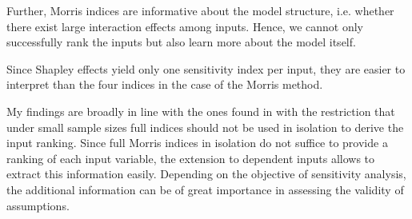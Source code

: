 Further, Morris indices are informative about the model structure, i.e. whether there exist large interaction effects among inputs. Hence, we cannot only successfully rank the inputs but also learn more about the model itself.

Since Shapley effects yield only one sensitivity index per input, they are easier to interpret than the four indices in the case of the Morris method.

My findings are broadly in line with the ones found in \citet{GM17} with the restriction that under small sample sizes full indices should not be used in isolation to derive the input ranking. %
Since full Morris indices in isolation do not suffice to provide a ranking of each input variable, the extension to dependent inputs allows to extract this information easily. Depending on the objective of sensitivity analysis, the additional information can be of great importance in assessing the validity of assumptions.